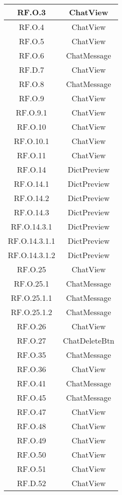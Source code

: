 \begin{adjustwidth}{-0.5cm}{-0.5cm}
\begin{longtable}{|c|c|}
    RF.O.3 & ChatView \\
		\hline RF.O.4 & ChatView \\
    \hline RF.O.5 & ChatView \\
    \hline RF.O.6 & ChatMessage \\
    \hline RF.D.7 & ChatView \\
    \hline RF.O.8 & ChatMessage \\
    \hline RF.O.9 & ChatView \\
    \hline RF.O.9.1 & ChatView \\
    \hline RF.O.10 & ChatView \\
    \hline RF.O.10.1 & ChatView \\
    \hline RF.O.11 & ChatView \\
    \hline RF.O.14 & DictPreview \\
    \hline RF.O.14.1 & DictPreview \\
    \hline RF.O.14.2 & DictPreview \\
    \hline RF.O.14.3 & DictPreview \\
    \hline RF.O.14.3.1 & DictPreview \\
    \hline RF.O.14.3.1.1 & DictPreview \\
    \hline RF.O.14.3.1.2 & DictPreview \\
    \hline RF.O.25 & ChatView \\
    \hline RF.O.25.1 & ChatMessage \\
    \hline RF.O.25.1.1 & ChatMessage \\
    \hline RF.O.25.1.2 & ChatMessage \\
    \hline RF.O.26 & ChatView \\
    \hline RF.O.27 & ChatDeleteBtn \\
    \hline RF.O.35 & ChatMessage \\
    \hline RF.O.36 & ChatView \\
    \hline RF.O.41 & ChatMessage \\
    \hline RF.O.45 & ChatMessage \\
    \hline RF.O.47 & ChatView \\
    \hline RF.O.48 & ChatView \\
    \hline RF.O.49 & ChatView \\
    \hline RF.O.50 & ChatView \\
    \hline RF.O.51 & ChatView \\
    \hline RF.D.52 & ChatView \\
  \end{longtable}
\end{adjustwidth}
\egroup

